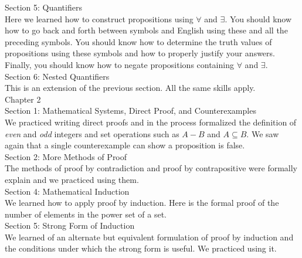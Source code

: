 \documentclass[12pt]{article}
\begin{document}
Section 5: Quantifiers\\
Here we learned how to  construct propositions using $\forall$ and $\exists.$ You should know how to go back and forth between symbols and English using these and all the preceding symbols. You should know how to determine the truth values of propositions using these symbols and how to properly justify your answers. Finally, you should know how to negate propositions containing $\forall$ and $\exists.$\\

Section 6: Nested Quantifiers\\
This is an extension of the previous section. All the same skills apply.\\

Chapter 2\\

Section 1: Mathematical Systems, Direct Proof, and Counterexamples\\
We practiced writing direct proofs and in the process formalized the definition of \emph{even} and \emph{odd} integers and set operations such as $A-B$ and $A \subseteq B.$ We saw again that a single counterexample can show a proposition is false.\\

Section 2: More Methods of Proof\\
The methods of proof by contradiction and proof by contrapositive were formally explain and we practiced using them.\\

Section 4: Mathematical Induction\\
We learned how to apply proof by induction. Here is the formal proof of the number of elements in the power set of a set.\\

Section 5: Strong Form of Induction\\
We learned of an alternate but equivalent formulation of proof by induction and the conditions under which the strong form is useful. We practiced using it.\\ 
\end{document}

